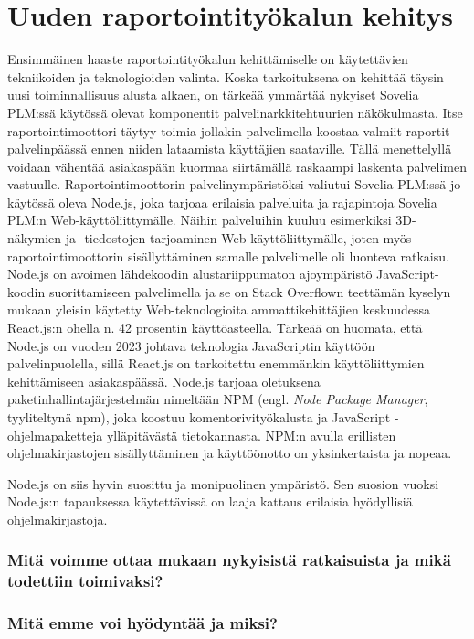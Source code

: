 \section{Uuden raportointityökalun kehitys}

Ensimmäinen haaste raportointityökalun kehittämiselle on käytettävien tekniikoiden ja teknologioiden valinta. Koska tarkoituksena on kehittää täysin uusi toiminnallisuus alusta alkaen, on tärkeää ymmärtää nykyiset Sovelia PLM:ssä käytössä olevat komponentit palvelinarkkitehtuurien näkökulmasta. Itse raportointimoottori täytyy toimia jollakin palvelimella koostaa valmiit raportit palvelinpäässä ennen niiden lataamista käyttäjien saataville. Tällä menettelyllä voidaan vähentää asiakaspään kuormaa siirtämällä raskaampi laskenta palvelimen vastuulle. Raportointimoottorin palvelinympäristöksi valiutui Sovelia PLM:ssä jo käytössä oleva Node.js, joka tarjoaa erilaisia palveluita ja rajapintoja Sovelia PLM:n Web-käyttöliittymälle. Näihin palveluihin kuuluu esimerkiksi 3D-näkymien ja -tiedostojen tarjoaminen Web-käyttöliittymälle, joten myös raportointimoottorin sisällyttäminen samalle palvelimelle oli luonteva ratkaisu. Node.js on avoimen lähdekoodin alustariippumaton ajoympäristö JavaScript-koodin suorittamiseen palvelimella ja se on Stack Overflown teettämän kyselyn mukaan yleisin käytetty Web-teknologioita ammattikehittäjien keskuudessa React.js:n ohella n. 42 prosentin käyttöasteella. \cite{stackoverflowStackOverflow} Tärkeää on huomata, että Node.js on vuoden 2023 johtava teknologia JavaScriptin käyttöön palvelinpuolella, sillä React.js on tarkoitettu enemmänkin käyttöliittymien kehittämiseen asiakaspäässä. Node.js tarjoaa oletuksena paketinhallintajärjestelmän nimeltään NPM (engl. \textit{Node Package Manager}, tyyliteltynä npm), joka koostuu komentorivityökalusta ja JavaScript -ohjelmapaketteja ylläpitävästä tietokannasta. NPM:n avulla erillisten ohjelmakirjastojen sisällyttäminen ja käyttöönotto on yksinkertaista ja nopeaa. \cite{npmjsAbout}

Node.js on siis hyvin suosittu ja monipuolinen ympäristö. Sen suosion vuoksi Node.js:n tapauksessa käytettävissä on laaja kattaus erilaisia hyödyllisiä ohjelmakirjastoja.

\subsubsection{Mitä voimme ottaa mukaan nykyisistä ratkaisuista ja mikä todettiin toimivaksi?}

\subsubsection{Mitä emme voi hyödyntää ja miksi?}
